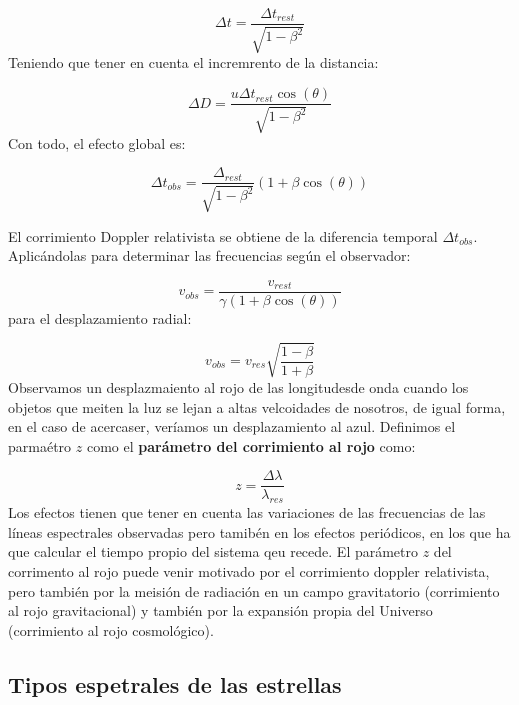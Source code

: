 \begin{equation}
    \Delta t = \frac{\Delta t_{rest}}{\sqrt{1-\beta^2}}
\end{equation}
Teniendo que tener en cuenta el incremrento de la distancia:

\begin{equation}
    \Delta D = \frac{u\Delta t_{rest}\cos(\theta)}{\sqrt{1-\beta^2}}
\end{equation}
Con todo, el efecto global es:

\begin{equation}
    \Delta t_{obs} = \frac{\Delta_{rest}}{\sqrt{1-\beta^2}}(1+\beta \cos (\theta))
\end{equation}

El corrimiento Doppler relativista se obtiene de la diferencia temporal $\Delta t_{obs}$. Aplicándolas para determinar las frecuencias según el observador:

\begin{equation}
    v_{obs} = \frac{v_{rest}}{\gamma(1+\beta \cos (\theta))}
\end{equation}
para el desplazamiento radial:

\begin{equation}
    v_{obs} = v_{res} \sqrt{\frac{1-\beta}{1+\beta}}
\end{equation}
Observamos un desplazmaiento al rojo de las longitudesde onda cuando los objetos que meiten la luz se lejan a altas velcoidades de nosotros, de igual forma, en el caso de acercaser, veríamos un desplazamiento al azul. Definimos el parmaétro $z$ como el \textbf{parámetro del corrimiento al rojo} como:

\begin{equation}
    z = \frac{\Delta \lambda}{\lambda_{res}}
\end{equation}
Los efectos tienen que tener en cuenta las variaciones de las frecuencias de las líneas espectrales observadas pero tamibén en los efectos periódicos, en los que ha que calcular el tiempo propio del sistema qeu recede. El parámetro $z$ del corrimento al rojo puede venir motivado por el corrimiento doppler relativista, pero también por la meisión de radiación en un campo gravitatorio (corrimiento al rojo gravitacional) y también por la expansión propia del Universo (corrimiento al rojo cosmológico). 

\subsection{Tipos espetrales de las estrellas}

